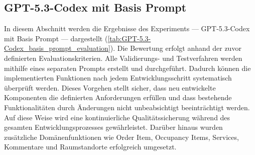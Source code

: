\subsection{GPT-5.3-Codex mit Basis Prompt}
In diesem Abschnitt werden die Ergebnisse des Experiments –– GPT-5.3-Codex mit Basis Prompt –– dargestellt (\ref{tab:GPT-5.3-Codex_basis_prompt_evaluation}).
Die Bewertung erfolgt anhand der zuvor definierten Evaluationskriterien.
Alle Validierungs- und Testverfahren werden mithilfe eines separaten Prompts erstellt und durchgeführt. Dadurch können die implementierten Funktionen nach jedem Entwicklungsschritt systematisch überprüft werden. Dieses Vorgehen stellt sicher, dass neu entwickelte Komponenten die definierten Anforderungen erfüllen und dass bestehende Funktionalitäten durch Änderungen nicht unbeabsichtigt beeinträchtigt werden. Auf diese Weise wird eine kontinuierliche Qualitätssicherung während des gesamten Entwicklungsprozesses gewährleistet.
Darüber hinaus wurden zusätzliche Domänenfunktionen wie Order Item, Occupancy Items, Services, Kommentare und Raumstandorte erfolgreich umgesetzt.


